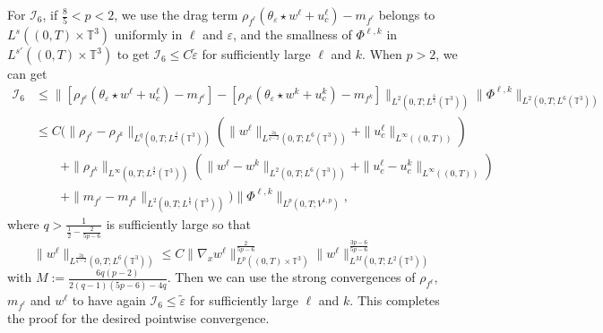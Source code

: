 \documentclass[10pt,reqno]{amsart}
\numberwithin{equation}{section}
\newcommand{\T}{\mathbb T}
\newcommand{\e}{\varepsilon}
\newcommand{\te}{\tilde\varepsilon}
\begin{document}
For $\mathcal{I}_6$, if $\frac85 < p <2$, we use the drag term $\rho_{f^\ell} (\theta_\e \star w^\ell + u_c^\ell) - m_{f^\ell}$ belongs to $L^s((0,T)\times\T^3)$ uniformly in $\ell$ and $\e$, and the smallness of $\Phi^{\ell,k}$ in $L^{s'}((0,T)\times\T^3)$ to get $\mathcal{I}_6 \le C\te$ for sufficiently large $\ell$ and $k$. When $p>2$, we can get
\[\begin{aligned}
\mathcal{I}_6 &\le  \|[\rho_{f^\ell} (\theta_\e \star w^\ell + u_c^\ell) - m_{f^\ell}] - [\rho_{f^k} ( \theta_\e \star w^k + u_c^k) - m_{f^k}]\|_{L^2(0,T; L^{\frac 65}(\T^3))} \|\Phi^{\ell,k}\|_{L^2(0,T; L^6(\T^3))}\\
&\le C\Big(\|\rho_{f^\ell} - \rho_{f^k}\|_{L^q(0,T;L^{\frac 32}(\T^3))}(\|w^\ell\|_{L^{\frac{2q}{q-2}}(0,T;L^6(\T^3))} + \|u_c^\ell\|_{L^\infty((0,T))})\\
&\qquad  + \|\rho_{f^k}\|_{L^\infty(0,T;L^{\frac32}(\T^3))}(\|w^\ell-w^k\|_{L^2(0,T;L^6(\T^3))} + \|u_c^\ell - u_c^k\|_{L^\infty((0,T))})\\
&\qquad + \|m_{f^\ell} - m_{f^k}\|_{L^2(0,T;L^{\frac65}(\T^3))}\Big)\|\Phi^{\ell,k}\|_{L^p(0,T;V^{1,p})},
\end{aligned}\]
where $q>\frac{1}{\frac12 - \frac{2}{5p-6}}$ is sufficiently large so that
\[
\|w^\ell\|_{L^{\frac{2q}{q-2}}(0,T;L^6(\T^3))} \le  C\|\nabla_x w^\ell\|_{L^p((0,T)\times\T^3)}^{\frac{2}{5p-6}} \|w^\ell\|_{L^M(0,T;L^2(\T^3))}^{\frac{3p-6}{5p-6}}
\]
with $M:= \frac{6q(p-2)}{2(q-1)(5p-6)-4q}$. Then we can use the strong convergences of $\rho_{f^\ell}$, $m_{f^\ell}$ and $w^\ell$ to have again $\mathcal{I}_6 \le \te$ for sufficiently large $\ell$ and $k$. This completes the proof for the desired pointwise convergence.

 


%
%
%
%
\end{document}
